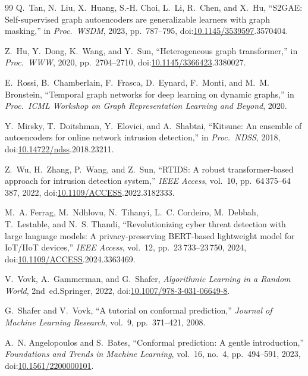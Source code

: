 \documentclass{ieeeaccess}
\begin{document}
\begin{thebibliography}{99}
Q.~Tan, N.~Liu, X.~Huang, S.-H. Choi, L.~Li, R.~Chen, and X.~Hu,
``S2GAE: Self-supervised graph autoencoders are generalizable learners
with graph masking,''
in \emph{Proc.\ WSDM}, 2023, pp.~787--795,
doi:\href{https://doi.org/10.1145/3539597}{10.1145/3539597}.3570404.

Z.~Hu, Y.~Dong, K.~Wang, and Y.~Sun,
``Heterogeneous graph transformer,''
in \emph{Proc.\ WWW}, 2020, pp.~2704--2710,
doi:\href{https://doi.org/10.1145/3366423}{10.1145/3366423}.3380027.

E.~Rossi, B.~Chamberlain, F.~Frasca, D.~Eynard, F.~Monti, and M.~M. Bronstein,
``Temporal graph networks for deep learning on dynamic graphs,''
in \emph{Proc.\ ICML Workshop on Graph Representation Learning and
Beyond}, 2020.

Y.~Mirsky, T.~Doitshman, Y.~Elovici, and A.~Shabtai,
``Kitsune: An ensemble of autoencoders for online network intrusion
detection,''
in \emph{Proc.\ NDSS}, 2018, doi:\href{https://doi.org/10.14722/ndss}{10.14722/ndss}.2018.23211.

Z.~Wu, H.~Zhang, P.~Wang, and Z.~Sun,
``RTIDS: A robust transformer-based approach for intrusion detection
system,''
\emph{IEEE Access}, vol.~10, pp.~64\,375--64\,387, 2022,
doi:\href{https://doi.org/10.1109/ACCESS}{10.1109/ACCESS}.2022.3182333.

M.~A. Ferrag, M.~Ndhlovu, N.~Tihanyi, L.~C. Cordeiro, M.~Debbah,
T.~Lestable, and N.~S. Thandi,
``Revolutionizing cyber threat detection with large language models: A
privacy-preserving BERT-based lightweight model for IoT/IIoT devices,''
\emph{IEEE Access}, vol.~12, pp.~23\,733--23\,750, 2024,
doi:\href{https://doi.org/10.1109/ACCESS}{10.1109/ACCESS}.2024.3363469.

V.~Vovk, A.~Gammerman, and G.~Shafer,
\emph{Algorithmic Learning in a Random World}, 2nd~ed.\quad Springer,
2022, doi:\href{https://doi.org/10.1007/978-3-031-06649-8}{10.1007/978-3-031-06649-8}.

G.~Shafer and V.~Vovk,
``A tutorial on conformal prediction,''
\emph{Journal of Machine Learning Research}, vol.~9, pp.~371--421, 2008.

A.~N. Angelopoulos and S.~Bates,
``Conformal prediction: A gentle introduction,''
\emph{Foundations and Trends in Machine Learning}, vol.~16, no.~4,
pp.~494--591, 2023, doi:\href{https://doi.org/10.1561/2200000101}{10.1561/2200000101}.


\end{thebibliography}
\end{document}
